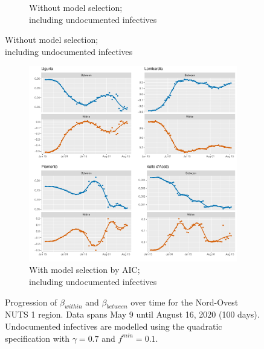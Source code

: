 \documentclass[12pt]{article}
\begin{document}
\begin{appendices}
\begin{figure}[H]
\begin{subfigure}{\textwidth}
    	      \caption{Without model selection; \\ including undocumented infectives}
    	      \label{fig:beta_between_over_time_nordovest_regular_undoc}
    	    \end{subfigure}
        \end{figure}
        \begin{figure}[H]\ContinuedFloat
    	    \begin{subfigure}{\textwidth}
    	      \centering
    	      \includegraphics[width=\linewidth]{output/model_between_lag14_betas_Nord-Ovest_aic_UndocQuadratic_rolling.pdf}
    	      \caption{With model selection by AIC; \\ including undocumented infectives}
    	      \label{fig:beta_between_over_time_nordovest_aic_undoc}
    	    \end{subfigure}
    	    \caption{Progression of $\beta_{within}$ and $\beta_{between}$ over time for the Nord-Ovest NUTS 1 region. Data spans May 9 until August 16, 2020 (100 days). Undocumented infectives are modelled using the quadratic specification with $\gamma = 0.7$ and $f^{min}=0.1$.}
    	    \label{fig:beta_between_over_time_nordovest}
        \end{figure}
		

\end{appendices}
\end{document}
